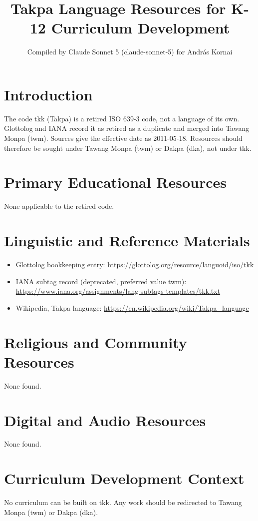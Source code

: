 \documentclass[12pt]{article}
\title{Takpa Language Resources for K-12 Curriculum Development}
\author{Compiled by Claude Sonnet 5 (claude-sonnet-5) for Andr\'as Kornai}
\date{}
\begin{document}
\maketitle

\section{Introduction}
The code tkk (Takpa) is a retired ISO 639-3 code, not a language of its own. Glottolog and IANA record it as retired as a duplicate and merged into Tawang Monpa (twm). Sources give the effective date as 2011-05-18. Resources should therefore be sought under Tawang Monpa (twm) or Dakpa (dka), not under tkk.

\section{Primary Educational Resources}
None applicable to the retired code.

\section{Linguistic and Reference Materials}
\begin{itemize}
\item Glottolog bookkeeping entry: \url{https://glottolog.org/resource/languoid/iso/tkk}
\item IANA subtag record (deprecated, preferred value twm): \url{https://www.iana.org/assignments/lang-subtags-templates/tkk.txt}
\item Wikipedia, Takpa language: \url{https://en.wikipedia.org/wiki/Takpa_language}
\end{itemize}

\section{Religious and Community Resources}
None found.

\section{Digital and Audio Resources}
None found.

\section{Curriculum Development Context}
No curriculum can be built on tkk. Any work should be redirected to Tawang Monpa (twm) or Dakpa (dka).
\end{document}
